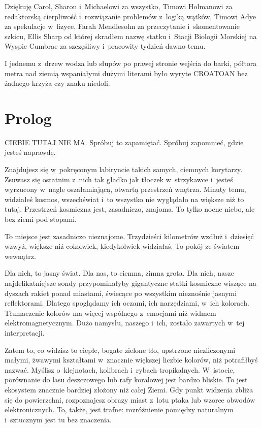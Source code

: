 \documentclass[oneside,polish,12pt,sfheadings]{mwbk}
\begin{document}
Dziękuję Carol, Sharon i~Michaelowi za wszystko, Timowi Holmanowi za
redaktorską cierpliwość i~rozwiązanie problemów z~logiką wątków, Timowi
Adye za spekulacje w~fizyce, Farah Mendlesohn za przeczytanie i~skomentowanie szkicu, Ellis Sharp od której skradłem nazwę statku i~Stacji Biologii Morskiej na Wyspie Cumbrae za szczęśliwy i~pracowity
tydzień dawno temu.

I jednemu z~drzew wodza lub słupów po prawej stronie wejścia do barki,
półtora metra nad ziemią wspaniałymi dużymi literami było wyryte CROATOAN
bez żadnego krzyża czy znaku niedoli.


\chapter{Prolog}


CIEBIE TUTAJ NIE MA. Spróbuj to zapamiętać. Spróbuj zapomnieć, gdzie
jesteś naprawdę.

Znajdujesz się w~pokręconym labiryncie takich samych, ciemnych
korytarzy. Zsuwasz się ostatnim z~nich tak gładko jak tłoczek w~strzykawce i~jesteś wyrzucony w~nagle oszałamiającą, otwartą przestrzeń
wnętrza. Minuty temu, widziałeś kosmos, wszechświat i~to wszystko nie
wyglądało na większe niż to tutaj. Przestrzeń kosmiczna jest,
zasadniczo, znajoma. To tylko nocne niebo, ale bez ziemi pod stopami.

To miejsce jest zasadniczo nieznajome. Trzydzieści kilometrów wzdłuż i~dziesięć wzwyż, większe niż cokolwiek, kiedykolwiek widziałaś. To pokój
ze światem wewnątrz.

Dla nich, to jasny świat. Dla nas, to ciemna, zimna grota. Dla nich,
nasze najdelikatniejsze sondy przypominałyby gigantyczne statki
kosmiczne wiszące na dyszach rakiet ponad miastami, świecące po
wszystkim nieznośnie jasnymi reflektorami. Dlatego spoglądamy ich
oczami, ich narzędziami, w~ich kolorach. Tłumaczenie kolorów ma więcej
wspólnego z~emocjami niż widmem elektromagnetycznym. Dużo namysłu,
naszego i~ich, zostało zawartych w~tej interpretacji.

Zatem to, co widzisz to ciepłe, bogate zielone tło, upstrzone
niezliczonymi małymi, żwawymi kształtami w~znacznie większej liczbie
kolorów, niż potrafiłbyś nazwać. Myślisz o~klejnotach, kolibrach i~rybach tropikalnych. W~istocie, porównanie do lasu deszczowego lub rafy
koralowej jest bardzo bliskie. To jest ekosystem znacznie bardziej
złożony niż całej Ziemi. Gdy punkt widzenia zbliża się do powierzchni,
rozpoznajesz obrazy miast z~lotu ptaka lub wzorce obwodów
elektronicznych. To, także, jest trafne: rozróżnienie pomiędzy
naturalnym i~sztucznym jest tu bez znaczenia.
\end{document}
